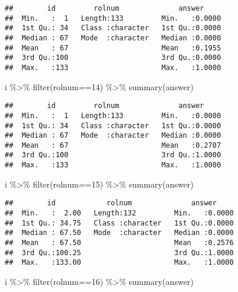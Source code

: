 \documentclass[
]{article}
\newenvironment{Shaded}{\begin{snugshade}}{\end{snugshade}}
\newcommand{\DecValTok}[1]{\textcolor[rgb]{0.00,0.00,0.81}{#1}}
\newcommand{\FunctionTok}[1]{\textcolor[rgb]{0.00,0.00,0.00}{#1}}
\newcommand{\NormalTok}[1]{#1}
\newcommand{\SpecialCharTok}[1]{\textcolor[rgb]{0.00,0.00,0.00}{#1}}
\begin{document}
\begin{enumerate}
\begin{verbatim}
##        id         rolnum              answer      
##  Min.   :  1   Length:133         Min.   :0.0000  
##  1st Qu.: 34   Class :character   1st Qu.:0.0000  
##  Median : 67   Mode  :character   Median :0.0000  
##  Mean   : 67                      Mean   :0.1955  
##  3rd Qu.:100                      3rd Qu.:0.0000  
##  Max.   :133                      Max.   :1.0000
\end{verbatim}

\begin{Shaded}
\begin{Highlighting}[]
\NormalTok{i }\SpecialCharTok{\%\textgreater{}\%} \FunctionTok{filter}\NormalTok{(rolnum}\SpecialCharTok{==}\DecValTok{14}\NormalTok{) }\SpecialCharTok{\%\textgreater{}\%} \FunctionTok{summary}\NormalTok{(answer)}
\end{Highlighting}
\end{Shaded}

\begin{verbatim}
##        id         rolnum              answer      
##  Min.   :  1   Length:133         Min.   :0.0000  
##  1st Qu.: 34   Class :character   1st Qu.:0.0000  
##  Median : 67   Mode  :character   Median :0.0000  
##  Mean   : 67                      Mean   :0.2707  
##  3rd Qu.:100                      3rd Qu.:1.0000  
##  Max.   :133                      Max.   :1.0000
\end{verbatim}

\begin{Shaded}
\begin{Highlighting}[]
\NormalTok{i }\SpecialCharTok{\%\textgreater{}\%} \FunctionTok{filter}\NormalTok{(rolnum}\SpecialCharTok{==}\DecValTok{15}\NormalTok{) }\SpecialCharTok{\%\textgreater{}\%} \FunctionTok{summary}\NormalTok{(answer)}
\end{Highlighting}
\end{Shaded}

\begin{verbatim}
##        id            rolnum              answer      
##  Min.   :  2.00   Length:132         Min.   :0.0000  
##  1st Qu.: 34.75   Class :character   1st Qu.:0.0000  
##  Median : 67.50   Mode  :character   Median :0.0000  
##  Mean   : 67.50                      Mean   :0.2576  
##  3rd Qu.:100.25                      3rd Qu.:1.0000  
##  Max.   :133.00                      Max.   :1.0000
\end{verbatim}

\begin{Shaded}
\begin{Highlighting}[]
\NormalTok{i }\SpecialCharTok{\%\textgreater{}\%} \FunctionTok{filter}\NormalTok{(rolnum}\SpecialCharTok{==}\DecValTok{16}\NormalTok{) }\SpecialCharTok{\%\textgreater{}\%} \FunctionTok{summary}\NormalTok{(answer)}
\end{Highlighting}
\end{Shaded}


\end{enumerate}
\end{document}
